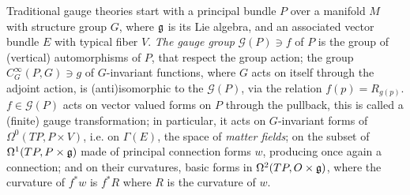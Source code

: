 




Traditional gauge theories start with a principal bundle $P$  over a manifold $M$ with structure group $G$, where $\mathfrak{g}$ is its Lie algebra, and an associated vector bundle $E$ with typical fiber $V$. \emph{The gauge group} $\mathcal G(P) \ni f$ of $P$ is the group of (vertical) automorphisms of $P$, that respect the group action; the group $C^\infty_G(P, G) \ni g$ of $G$-invariant functions, where $G$ acts on itself through the adjoint action, is (anti)isomorphic to the $\mathcal G(P)$, via the relation $f(p) = R_{g(p)}$. $f\in \mathcal G(P)$ acts on vector valued forms on $P$ through the pullback, this is called a (finite) gauge transformation; in particular, it acts on $G$-invariant forms of $\Omega^0(TP, P \times V)$, i.e. on $\Gamma(E)$, the space of \emph{matter fields}; on the subset of $\Omega^1(TP, P \times \mathfrak{g})$ made of principal connection forms $w$, producing once again a connection; and on their curvatures, basic forms in $\Omega^2(TP, O \times \mathfrak{g})$, where the curvature of $f^*w$ is $f^*R$ where $R$ is the curvature of $w$.

